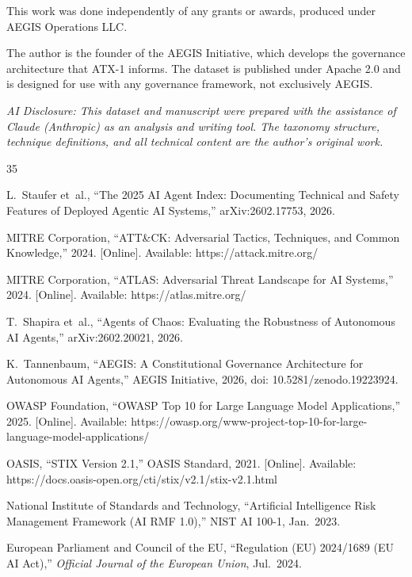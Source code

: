 \documentclass{IEEEoj-data}
\newcommand{\replaced}[2]{#1}
\newcommand{\deleted}[1]{}
\begin{document}
This work was done independently of any grants or awards, produced under AEGIS Operations LLC.

The author is the founder of the AEGIS Initiative, which develops the governance architecture that ATX-1 informs. The dataset is published under Apache 2.0 and is designed for use with any governance framework, not exclusively AEGIS.

{\it AI Disclosure: This dataset and manuscript were prepared with the assistance of Claude (Anthropic) as an analysis and writing tool. The taxonomy structure, technique definitions, \deleted{severity assessments, }and all technical content are the author's original work.}


\begin{thebibliography}{35}

\replaced{L.~Staufer et~al., ``The 2025 AI Agent Index: Documenting Technical and Safety Features of Deployed Agentic AI Systems,'' arXiv:2602.17753, 2026.}{R.~Chan et~al., ``The 2025 AI Agent Index,'' arXiv:2602.17753, 2025.}

MITRE Corporation, ``ATT\&CK: Adversarial Tactics, Techniques, and Common Knowledge,'' 2024. [Online]. Available: https://attack.mitre.org/

MITRE Corporation, ``ATLAS: Adversarial Threat Landscape for AI Systems,'' 2024. [Online]. Available: https://atlas.mitre.org/

T.~Shapira et~al., ``Agents of Chaos: Evaluating the Robustness of Autonomous AI Agents,'' arXiv:2602.20021, 2026.

K.~Tannenbaum, ``AEGIS: A Constitutional Governance Architecture for Autonomous AI Agents,'' AEGIS Initiative, 2026, doi: 10.5281/zenodo.19223924.

OWASP Foundation, ``OWASP Top 10 for Large Language Model Applications,'' 2025. [Online]. Available: https://owasp.org/www-project-top-10-for-large-language-model-applications/

OASIS, ``STIX Version 2.1,'' OASIS Standard, 2021. [Online]. Available: https://docs.oasis-open.org/cti/stix/v2.1/stix-v2.1.html

National Institute of Standards and Technology, ``Artificial Intelligence Risk Management Framework (AI RMF 1.0),'' NIST AI 100-1, Jan.\ 2023.

European Parliament and Council of the EU, ``Regulation (EU) 2024/1689 (EU AI Act),'' {\it Official Journal of the European Union}, Jul.\ 2024.


\end{thebibliography}
\end{document}
